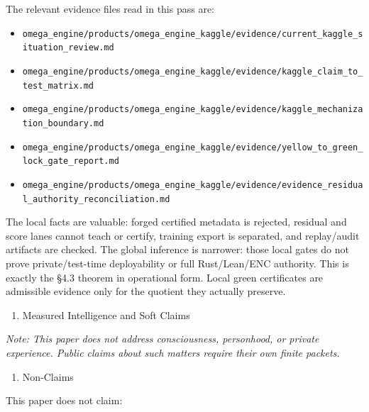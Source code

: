 \documentclass[
  10pt,
]{article}
\providecommand{\tightlist}{%
  \setlength{\itemsep}{0pt}\setlength{\parskip}{0pt}}
\providecommand{\tightlist}{%
  \setlength{\itemsep}{0pt}\setlength{\parskip}{0pt}}
\DeclareRobustCommand{\texttt}[1]{{\paperSymbolFont\nolinkurl{#1}}}
\begin{document}
The relevant evidence files read in this pass are:

\begin{itemize}
\tightlist
\item
  \texttt{omega\_engine/products/omega\_engine\_kaggle/evidence/current\_kaggle\_situation\_review.md}
\item
  \texttt{omega\_engine/products/omega\_engine\_kaggle/evidence/kaggle\_claim\_to\_test\_matrix.md}
\item
  \texttt{omega\_engine/products/omega\_engine\_kaggle/evidence/kaggle\_mechanization\_boundary.md}
\item
  \texttt{omega\_engine/products/omega\_engine\_kaggle/evidence/yellow\_to\_green\_lock\_gate\_report.md}
\item
  \texttt{omega\_engine/products/omega\_engine\_kaggle/evidence/evidence\_residual\_authority\_reconciliation.md}
\end{itemize}

The local facts are valuable: forged certified metadata is rejected, residual and score lanes cannot teach or certify, training export is separated, and replay/audit artifacts are checked. The global inference is narrower: those local gates do not prove private/test-time deployability or full Rust/Lean/ENC authority. This is exactly the §4.3 theorem in operational form. Local green certificates are admissible evidence only for the quotient they actually preserve.

\begin{enumerate}
\def\labelenumi{\arabic{enumi}.}
\setcounter{enumi}{18}
\tightlist
\item
  Measured Intelligence and Soft Claims
\end{enumerate}

\emph{Note: This paper does not address consciousness, personhood, or private experience. Public claims about such matters require their own finite packets.}

\begin{enumerate}
\def\labelenumi{\arabic{enumi}.}
\setcounter{enumi}{19}
\tightlist
\item
  Non-Claims
\end{enumerate}

This paper does not claim:
\end{document}
